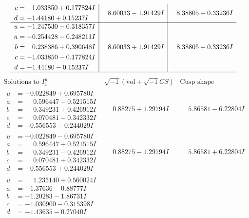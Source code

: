 \documentclass[1p]{elsarticle_modified}
\theoremstyle{definition}
\newcommand{\I}{\sqrt{-1}}
\begin{document}
$$\begin{array}{c|c|c}
\begin{aligned}
c &= -1.033850 + 0.177824 I \\
d &= -1.44180 + 0.15237 I\end{aligned}
 & \phantom{-}8.60033 - 1.91429 I & \phantom{-}8.38805 + 0.33236 I \\ \hline\begin{aligned}
u &= -1.247530 - 0.318357 I \\
a &= -0.254428 - 0.248211 I \\
b &= \phantom{-}0.238386 + 0.390648 I \\
c &= -1.033850 - 0.177824 I \\
d &= -1.44180 - 0.15237 I\end{aligned}
 & \phantom{-}8.60033 + 1.91429 I & \phantom{-}8.38805 - 0.33236 I\\
 \hline 
 \end{array}$$\newpage$$\begin{array}{c|c|c}  
\text{Solutions to }I^u_{1}& \I (\text{vol} + \sqrt{-1}CS) & \text{Cusp shape}\\
 \hline 
\begin{aligned}
u &= -0.022849 + 0.695780 I \\
a &= \phantom{-}0.596447 - 0.521515 I \\
b &= \phantom{-}0.349231 + 0.426912 I \\
c &= \phantom{-}0.070481 - 0.342332 I \\
d &= -0.556553 - 0.244029 I\end{aligned}
 & \phantom{-}0.88275 + 1.29794 I & \phantom{-}5.86581 - 6.22804 I \\ \hline\begin{aligned}
u &= -0.022849 - 0.695780 I \\
a &= \phantom{-}0.596447 + 0.521515 I \\
b &= \phantom{-}0.349231 - 0.426912 I \\
c &= \phantom{-}0.070481 + 0.342332 I \\
d &= -0.556553 + 0.244029 I\end{aligned}
 & \phantom{-}0.88275 - 1.29794 I & \phantom{-}5.86581 + 6.22804 I \\ \hline\begin{aligned}
u &= \phantom{-}1.235140 + 0.560024 I \\
a &= -1.37636 - 0.88777 I \\
b &= -1.20283 - 1.86731 I \\
c &= -1.030900 - 0.315398 I \\
d &= -1.43635 - 0.27040 I\end{aligned}

\end{array}$$
\end{document}
